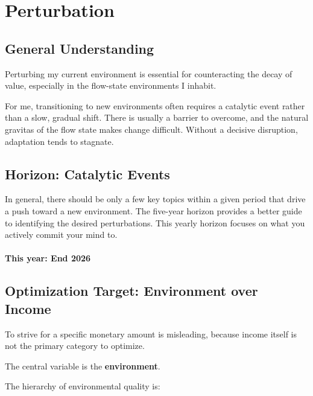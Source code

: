  \section{Perturbation}
 \subsection{General Understanding}
 
 Perturbing my current environment is essential for counteracting the decay of value, especially in the flow-state environments I inhabit.
 
 For me, transitioning to new environments often requires a catalytic event rather than a slow, gradual shift. There is usually a barrier to overcome, and the natural gravitas of the flow state makes change difficult. Without a decisive disruption, adaptation tends to stagnate.
 
 \subsection{Horizon: Catalytic Events}
 
 In general, there should be only a few key topics within a given period that drive a push toward a new environment. The five-year horizon provides a better guide to identifying the desired perturbations. This yearly horizon focuses on what you actively commit your mind to.
 
 
 \paragraph{This year: End 2026}
 
 \subsection{Optimization Target: Environment over Income}
 
 To strive for a specific monetary amount is misleading, because income itself is not the primary category to optimize.
 
 The central variable is the \textbf{environment}.
 
 The hierarchy of environmental quality is:
 

